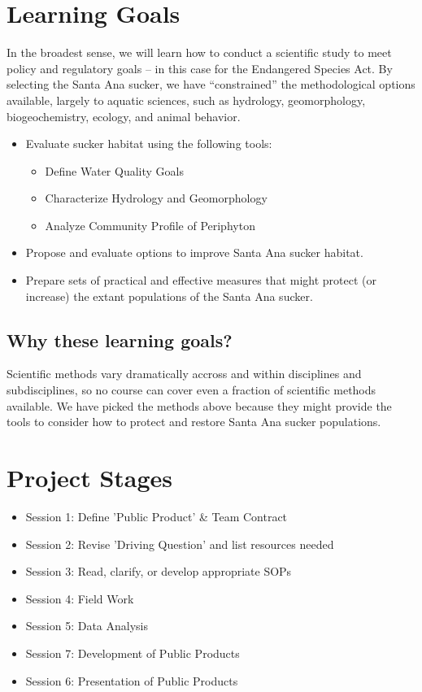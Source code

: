 \documentclass{tufte-handout}\usepackage[]{graphicx}\usepackage[]{color}
\begin{document}
\section{Learning Goals}

In the broadest sense, we will learn how to conduct a scientific study to meet policy and regulatory goals -- in this case for the Endangered Species Act. By selecting the Santa Ana sucker, we have ``constrained'' the methodological options available, largely to aquatic sciences, such as hydrology, geomorphology, biogeochemistry, ecology, and animal behavior. 

\begin{itemize}
  \item Evaluate sucker habitat using the following tools:
  \begin{itemize}
    \item Define Water Quality Goals
    \item Characterize Hydrology and Geomorphology
    \item Analyze Community Profile of Periphyton
  \end{itemize}
  \item Propose and evaluate options to improve Santa Ana sucker habitat.
  \item Prepare sets of practical and effective measures that might protect (or increase) the extant populations of the Santa Ana sucker.
\end{itemize}

\subsection{Why these learning goals?}

Scientific methods vary dramatically accross and within disciplines and subdisciplines, so no course can cover even a fraction of scientific methods available. We have picked the methods above because they might provide the tools to consider how to protect and restore Santa Ana sucker populations.

\section{Project Stages}

\begin{itemize}
  \item Session 1: Define 'Public Product' \& Team Contract
  \item Session 2: Revise 'Driving Question' and list resources needed
  \item Session 3: Read, clarify, or develop appropriate SOPs
  \item Session 4: Field Work
  \item Session 5: Data Analysis
  \item Session 7: Development of Public Products
  \item Session 6: Presentation of Public Products
\end{itemize}
\end{document}
